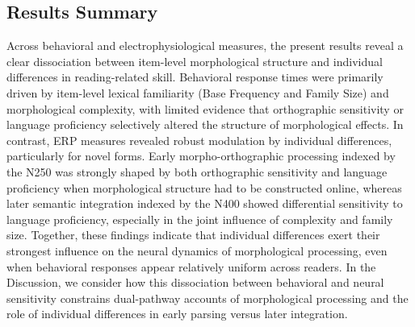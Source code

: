 \subsection{Results Summary}
Across behavioral and electrophysiological measures, the present results reveal a clear dissociation between item-level morphological structure and individual differences in reading-related skill. Behavioral response times were primarily driven by item-level lexical familiarity (Base Frequency and Family Size) and morphological complexity, with limited evidence that orthographic sensitivity or language proficiency selectively altered the structure of morphological effects. In contrast, ERP measures revealed robust modulation by individual differences, particularly for novel forms. Early morpho-orthographic processing indexed by the N250 was strongly shaped by both orthographic sensitivity and language proficiency when morphological structure had to be constructed online, whereas later semantic integration indexed by the N400 showed differential sensitivity to language proficiency, especially in the joint influence of complexity and family size. Together, these findings indicate that individual differences exert their strongest influence on the neural dynamics of morphological processing, even when behavioral responses appear relatively uniform across readers. In the Discussion, we consider how this dissociation between behavioral and neural sensitivity constrains dual-pathway accounts of morphological processing and the role of individual differences in early parsing versus later integration.

